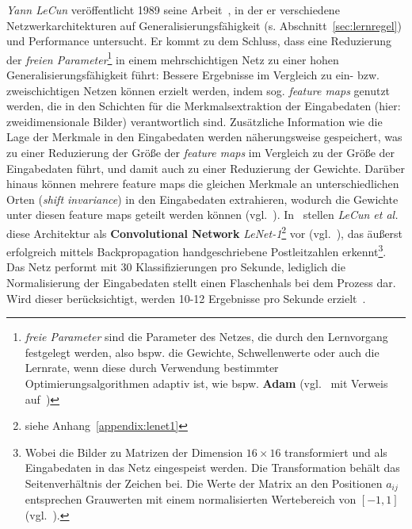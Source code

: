 \textit{Yann LeCun} veröffentlicht 1989 seine Arbeit~\cite{Cun89}, in der er verschiedene Netzwerkarchitekturen auf Generalisierungsfähigkeit (s. Abschnitt~\ref{sec:lernregel}) und Performance untersucht. Er kommt zu dem Schluss, dass eine Reduzierung der \textit{freien Parameter}\footnote{
    \textit{freie Parameter} sind die Parameter des Netzes, die durch den Lernvorgang festgelegt werden, also bspw. die Gewichte, Schwellenwerte oder auch die Lernrate, wenn diese durch Verwendung bestimmter Optimierungsalgorithmen adaptiv ist, wie bspw. \textbf{Adam} (vgl.~\cite[346]{GBC18} mit Verweis auf~\cite{KB17})
} in einem mehrschichtigen Netz zu einer hohen Generalisierungsfähigkeit führt: Bessere Ergebnisse im Vergleich zu  ein- bzw. zweischichtigen Netzen können erzielt werden, indem sog. \textit{feature maps} genutzt werden, die in den Schichten für die Merkmalsextraktion der Eingabedaten (hier: zweidimensionale Bilder) verantwortlich sind.
Zusätzliche Information wie die Lage der Merkmale in den Eingabedaten werden näherungsweise gespeichert, was zu einer Reduzierung der Größe der \textit{feature maps} im Vergleich zu der Größe der Eingabedaten führt, und damit auch zu einer Reduzierung der Gewichte.
Darüber hinaus können mehrere feature maps die gleichen Merkmale an unterschiedlichen Orten (\textit{shift invariance}) in den Eingabedaten extrahieren, wodurch die Gewichte unter diesen feature maps geteilt werden können (vgl.~\cite[151 f.]{Cun89}).
In~\cite{CBD+89} stellen \textit{LeCun et al.} diese Architektur als \textbf{Convolutional Network} \textit{LeNet-1}\footnote{
    siehe Anhang~\ref{appendix:lenet1}
}  vor (vgl.~\cite[13]{CBBH98}), das äußerst erfolgreich mittels Backpropagation handgeschriebene Postleitzahlen erkennt\footnote{
    Wobei die Bilder zu Matrizen der Dimension $16 \times 16$ transformiert und als Eingabedaten in das Netz eingespeist werden. Die Transformation behält das Seitenverhältnis der Zeichen bei. Die Werte der Matrix an den Positionen $a_{ij}$ entsprechen Grauwerten mit einem normalisierten Wertebereich von $[-1, 1]$ (vgl.~\cite[542]{CBD+89}).
}. Das Netz performt mit 30 Klassifizierungen pro Sekunde, lediglich die Normalisierung der Eingabedaten stellt einen Flaschenhals bei dem Prozess dar. Wird dieser berücksichtigt, werden 10-12 Ergebnisse pro Sekunde erzielt~\cite[549]{CBD+89}.\\



